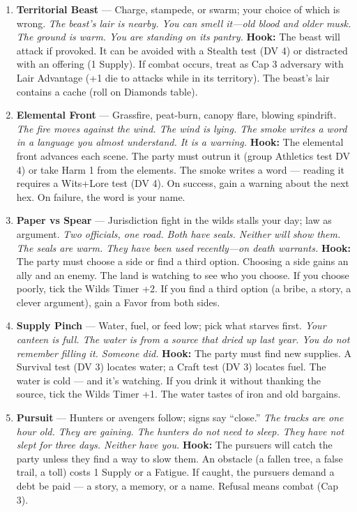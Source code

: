 \begin{enumerate}
\item \textbf{Territorial Beast} --- Charge, stampede, or swarm; your choice of which is wrong.
  \hfill \textit{The beast's lair is nearby. You can smell it---old blood and older musk. The ground is warm. You are standing on its pantry.}
  \textbf{Hook:} The beast will attack if provoked. It can be avoided with a Stealth test (DV 4) or distracted with an offering (1 Supply). If combat occurs, treat as Cap 3 adversary with Lair Advantage (+1 die to attacks while in its territory). The beast's lair contains a cache (roll on Diamonds table).
  
\item \textbf{Elemental Front} --- Grassfire, peat-burn, canopy flare, blowing spindrift.
  \hfill \textit{The fire moves against the wind. The wind is lying. The smoke writes a word in a language you almost understand. It is a warning.}
  \textbf{Hook:} The elemental front advances each scene. The party must outrun it (group Athletics test DV 4) or take Harm 1 from the elements. The smoke writes a word --- reading it requires a Wits+Lore test (DV 4). On success, gain a warning about the next hex. On failure, the word is your name.
  
\item \textbf{Paper vs Spear} --- Jurisdiction fight in the wilds stalls your day; law as argument.
  \hfill \textit{Two officials, one road. Both have seals. Neither will show them. The seals are warm. They have been used recently---on death warrants.}
  \textbf{Hook:} The party must choose a side or find a third option. Choosing a side gains an ally and an enemy. The land is watching to see who you choose. If you choose poorly, tick the Wilds Timer +2. If you find a third option (a bribe, a story, a clever argument), gain a Favor from both sides.
  
\item \textbf{Supply Pinch} --- Water, fuel, or feed low; pick what starves first.
  \hfill \textit{Your canteen is full. The water is from a source that dried up last year. You do not remember filling it. Someone did.}
  \textbf{Hook:} The party must find new supplies. A Survival test (DV 3) locates water; a Craft test (DV 3) locates fuel. The water is cold --- and it's watching. If you drink it without thanking the source, tick the Wilds Timer +1. The water tastes of iron and old bargains.
  
\item[J] \textbf{Pursuit} --- Hunters or avengers follow; signs say ``close.''
  \hfill \textit{The tracks are one hour old. They are gaining. The hunters do not need to sleep. They have not slept for three days. Neither have you.}
  \textbf{Hook:} The pursuers will catch the party unless they find a way to slow them. An obstacle (a fallen tree, a false trail, a toll) costs 1 Supply or a Fatigue. If caught, the pursuers demand a debt be paid --- a story, a memory, or a name. Refusal means combat (Cap 3).
  

\end{enumerate}
